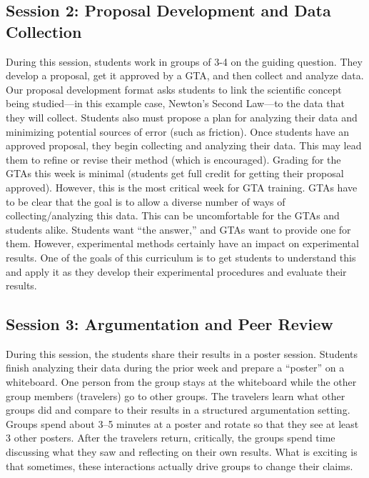 \documentclass[aip, numerical, preprint]{revtex4-2}
\begin{document}
\subsection{Session 2: Proposal Development and Data Collection}
During this session, students work in groups of 3-4 on the guiding question.  They develop a
proposal, get it approved by a GTA, and then collect and analyze data.  Our proposal
development format asks students to link the scientific concept being studied---in this example
case, Newton's Second Law---to the data that they will collect.  Students also must propose a
plan for analyzing their data and minimizing potential sources of error (such as friction).
Once students have an approved proposal, they begin collecting and analyzing their data.  This
may lead them to refine or revise their method (which is encouraged).  Grading for the GTAs
this week is minimal (students get full credit for getting their proposal approved).  However,
this is the most critical week for GTA training.  GTAs have to be clear that the goal is to
allow a diverse number of ways of collecting/analyzing this data. This can be uncomfortable for
the GTAs and students alike.  Students want ``the answer,'' and GTAs want to provide one for
them.  However, experimental methods certainly have an impact on experimental results. One of
the goals of this curriculum is to get students to understand this and apply it as they develop
their experimental procedures and evaluate their results.

\subsection{Session 3: Argumentation and Peer Review}
During this session, the students share their results in a poster session.  Students finish
analyzing their data during the prior week and prepare a ``poster'' on a whiteboard.  One
person from the group stays at the whiteboard while the other group members (travelers) go to
other groups.  The travelers learn what other groups did and compare to their results in a
structured argumentation setting.  Groups spend about 3--5 minutes at a poster and rotate so
that they see at least 3 other posters.  After the travelers return, critically, the groups
spend time discussing what they saw and reflecting on their own results.  What is exciting is
that sometimes, these interactions actually drive groups to change their
claims.\citep{Walker2019}
\end{document}
